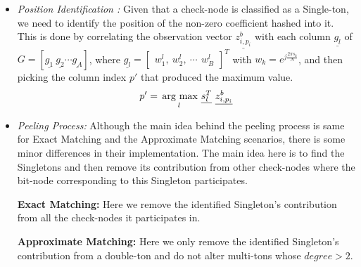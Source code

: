 \begin{enumerate}
\begin{itemize}
			 \item \textit{Position Identification :} Given that a check-node is classified as a Single-ton, we need to identify the position of the non-zero coefficient  hashed into it. This is done by correlating the observation vector $\underline{z^{b}_{i,p_i}}$ with each column $\underline{g_l}$ of  $G = [\underline{g_1} \ \underline{g_2} \cdots \underline{g_A}]$, where $\underline{g_l} =\begin{bmatrix}
			 w_1^{l}, ~ w_2^{l}, ~ \cdots\, ~ w_B^{l}
			 \end{bmatrix}^{T}$ with $w_k = e^{j \frac{2\pi s_k}{N}}$,  and then picking the column index  $p'$ that produced the maximum value.
			 \[ p' = \underset{l}{\operatorname*{\,arg\ max}}\  \underline{s^T_l} ~ \underline{z^{b}_{i,p_i}}\]
			 
			 \item \textit{Peeling Process: } Although the main idea behind the peeling process is same for Exact Matching and the Approximate Matching scenarios, there is some minor differences in their implementation. The main idea here is to find the Singletons and then remove its contribution from other check-nodes where the bit-node corresponding to this Singleton participates.
			 
			 
			  {\bf Exact Matching:} Here we remove the identified Singleton's contribution from all the check-nodes it participates in.
			  
			  {\bf Approximate Matching:} Here we only remove the identified Singleton's contribution from a double-ton and do not alter multi-tons whose $degree > 2$.
			  		 
		 \end{itemize} 
	 
	 
\end{enumerate}	
	 